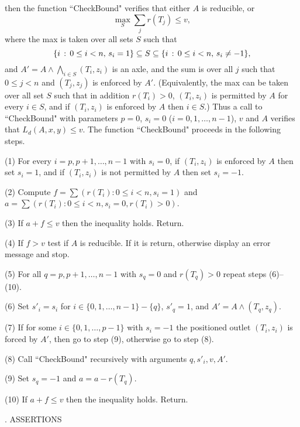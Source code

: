 \noindent then the function ``CheckBound" verifies that either $A$ is
reducible,  or
$$\max_S \sum_j r(T_j)\le v,$$
where the max is taken over all sets $S$ such that
$$\{i\,:\, 0\le i<n,\,s_i=1\}\subseteq S\subseteq\{i\,:\, 0\le i<n,\,
s_i\ne-1\},$$
and  $A'=
A\wedge\bigwedge_{i\in S} (T_i,z_i)$ is an axle, and the sum is 
over all $j$ such
that $0\le j <n$ and $(T_j,z_j)$ is enforced by $A'$.  (Equivalently, the 
max
can be taken over all set $S$ such that in addition 
$r(T_i)>0$, $(T_i,z_i)$ is permitted by $A$ for every $i\in S$,
and if $(T_i,z_i)$ is enforced by $A$ then $i\in S$.)
Thus a call
to ``CheckBound" with parameters $p=0$, $s_i=0$ ($i=0,1,\dots, n-1$), 
$v$ and $A$
verifies that $L_d(A,x,y)\le v$.  The function ``CheckBound" proceeds 
in the following
steps.
\item{(1)} For every $i=p,p+1,\dots, n-1$ with $s_i=0$, if $(T_i,z_i)$ 
is enforced by
$A$ then set $s_i=1$, and if $(T_i,z_i)$ is not permitted by $A$ then 
set $s_i=-1$.
\item{(2)} Compute $f=\sum (r(T_i):0\le i<n,s_i=1)$ and 
$a=\sum (r(T_i):0\le i<n,s_i=0, r(T_i)>0)$.
\item{(3)} If $a+f\le v$ then the inequality holds.  Return.
\item{(4)} If $f>v$ test if $A$ is reducible.  If it is return, otherwise 
display an
error message and stop.
\item{(5)} For all $q=p,p+1,\dots, n-1$ with $s_q=0$ and $r(T_q)>0$ repeat
steps (6)--(10).
\item{(6)} Set $s'_i=s_i$ for $i\in \{0,1,\dots, n-1\}-\{q\}$,
$s'_q=1$, and $A'=A\wedge (T_q, z_q)$.
\item{(7)} If for some $i\in\{0,1,\dots, p-1\}$ with $s_i=-1$ the positioned 
outlet
$(T_i,z_i)$ is forced by $A'$, then go to step (9), otherwise go to step 
(8).
\item{(8)} Call ``CheckBound" recursively with arguments $q,
s'_i,v,A'$. 
\item{(9)} Set $s_q=-1$ and $a=a-r(T_q)$.
\item{(10)} If $a+f\le v$ then the inequality holds. Return.

.  ASSERTIONS

